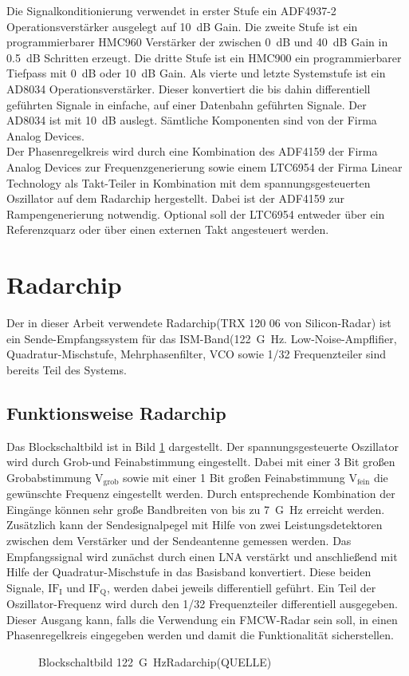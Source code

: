 Die Signalkonditionierung verwendet in erster Stufe ein ADF4937-2 Operationsverstärker ausgelegt auf \SI{10}{dB} Gain. Die zweite Stufe ist ein programmierbarer HMC960 Verstärker der zwischen \SI{0}{dB} und \SI{40}{dB} Gain in \SI{0.5}{dB} Schritten erzeugt. Die dritte Stufe ist ein HMC900 ein programmierbarer Tiefpass mit \SI{0}{dB} oder \SI{10}{dB} Gain. Als vierte und letzte Systemstufe ist ein AD8034 Operationsverstärker. Dieser konvertiert die bis dahin differentiell geführten Signale in einfache, auf einer Datenbahn geführten Signale. Der AD8034 ist mit \SI{10}{dB} auslegt. Sämtliche Komponenten sind von der Firma Analog Devices.\\
Der Phasenregelkreis wird durch eine Kombination des ADF4159 der Firma Analog Devices zur Frequenzgenerierung sowie einem LTC6954 der Firma Linear Technology als Takt-Teiler in Kombination mit dem spannungsgesteuerten
Oszillator  auf dem Radarchip hergestellt. Dabei ist der ADF4159 zur Rampengenerierung notwendig. Optional soll der LTC6954 entweder über ein Referenzquarz oder über einen externen Takt angesteuert werden.
\section{Radarchip}
Der in dieser Arbeit verwendete Radarchip(TRX 120 06 von Silicon-Radar) ist ein Sende-Empfangssystem für das ISM-Band(\SI{122}{G\hertz}.  Low-Noise-Ampflifier, Quadratur-Mischstufe, Mehrphasenfilter, VCO sowie 1/32 Frequenzteiler sind bereits Teil des Systems. 
\subsection{Funktionsweise Radarchip}
Das Blockschaltbild ist in Bild \ref{fig:Radarchip} dargestellt. Der spannungsgesteuerte Oszillator wird durch Grob-und Feinabstimmung eingestellt. Dabei mit einer 3 Bit großen Grobabstimmung $\text{V}_{\text{grob}}$ sowie mit einer 1 Bit großen Feinabstimmung $\text{V}_{\text{fein}}$ die gewünschte Frequenz eingestellt werden. Durch entsprechende Kombination der Eingänge können sehr große Bandbreiten von bis zu \SI{7}{G\hertz} erreicht werden. Zusätzlich kann der Sendesignalpegel mit Hilfe von zwei Leistungsdetektoren zwischen dem Verstärker und der Sendeantenne gemessen werden. Das Empfangssignal wird zunächst durch einen LNA verstärkt und anschließend mit Hilfe der Quadratur-Mischstufe in das Basisband konvertiert. Diese beiden Signale, $\text{IF}_{\text{I}}$ und $\text{IF}_{\text{Q}}$, werden dabei jeweils differentiell geführt. Ein Teil der Oszillator-Frequenz wird durch den 1/32 Frequenzteiler differentiell ausgegeben. Dieser Ausgang kann, falls die Verwendung ein FMCW-Radar sein soll, in einen Phasenregelkreis eingegeben werden und damit die Funktionalität sicherstellen.
\begin{figure}[tbp]
  \centering
  
  \caption{Blockschaltbild \SI{122}{G\hertz}Radarchip(QUELLE)}
  \label{fig:Radarchip}
\end{figure}
